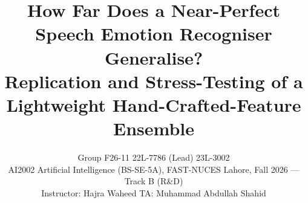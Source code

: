 \documentclass[10pt,a4paper,twocolumn]{article}
\title{\textbf{How Far Does a Near-Perfect Speech Emotion Recogniser Generalise?}\\[2pt]
\large Replication and Stress-Testing of a Lightweight Hand-Crafted-Feature Ensemble}
\author{Group F26-11 \quad 22L-7786 (Lead) \quad 23L-3002\\
\small AI2002 Artificial Intelligence (BS-SE-5A), FAST-NUCES Lahore, Fall 2026 --- Track B (R\&D)\\
\small Instructor: Hajra Waheed \quad TA: Muhammad Abdullah Shahid}
\date{}
\begin{document}
\maketitle




\small


\end{document}
